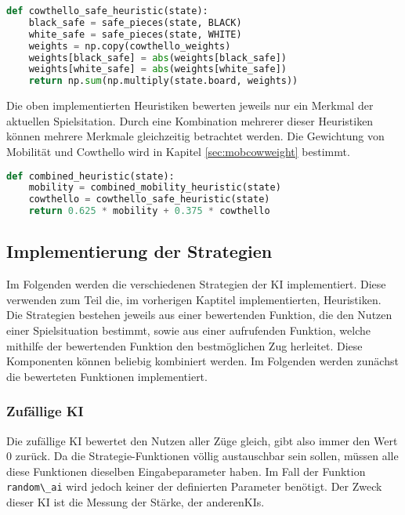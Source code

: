 \begin{lstlisting}[language=Python]
def cowthello_safe_heuristic(state):
    black_safe = safe_pieces(state, BLACK)
    white_safe = safe_pieces(state, WHITE)
    weights = np.copy(cowthello_weights)
    weights[black_safe] = abs(weights[black_safe])
    weights[white_safe] = abs(weights[white_safe])
    return np.sum(np.multiply(state.board, weights))
\end{lstlisting}

Die oben implementierten Heuristiken bewerten jeweils nur ein Merkmal
der aktuellen Spielsitation. Durch eine Kombination mehrerer dieser
Heuristiken können mehrere Merkmale gleichzeitig betrachtet werden. Die
Gewichtung von Mobilität und Cowthello wird in Kapitel
\ref{sec:mobcowweight} bestimmt.

\begin{lstlisting}[language=Python]
def combined_heuristic(state):
    mobility = combined_mobility_heuristic(state)
    cowthello = cowthello_safe_heuristic(state)
    return 0.625 * mobility + 0.375 * cowthello
\end{lstlisting}

\hypertarget{implementierung-der-strategien}{%
\subsection{Implementierung der
Strategien}\label{implementierung-der-strategien}}

Im Folgenden werden die verschiedenen Strategien der \ac{KI}
implementiert. Diese verwenden zum Teil die, im vorherigen Kaptitel
implementierten, Heuristiken. Die Strategien bestehen jeweils aus einer
bewertenden Funktion, die den Nutzen einer Spielsituation bestimmt,
sowie aus einer aufrufenden Funktion, welche mithilfe der bewertenden
Funktion den bestmöglichen Zug herleitet. Diese Komponenten können
beliebig kombiniert werden. Im Folgenden werden zunächst die bewerteten
Funktionen implementiert.

\hypertarget{zufuxe4llige-ki}{%
\subsubsection{Zufällige KI}\label{zufuxe4llige-ki}}

Die zufällige \ac{KI} bewertet den Nutzen aller Züge gleich, gibt also
immer den Wert \(0\) zurück. Da die Strategie-Funktionen völlig
austauschbar sein sollen, müssen alle diese Funktionen dieselben
Eingabeparameter haben. Im Fall der Funktion
\passthrough{\lstinline!random\_ai!} wird jedoch keiner der definierten
Parameter benötigt. Der Zweck dieser \ac{KI} ist die Messung der Stärke,
der anderen\acp{KI}.

